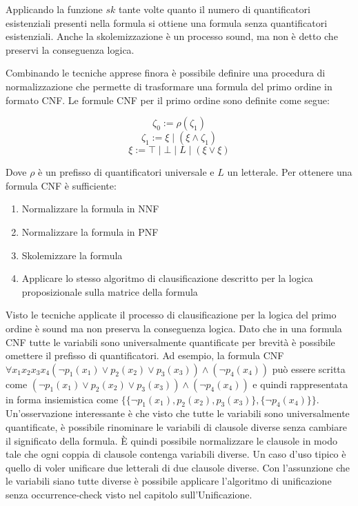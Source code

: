 \documentclass[./main.tex]{subfiles}
\begin{document}
Applicando la funzione $sk$ tante volte quanto il numero di quantificatori esistenziali presenti nella formula si ottiene una formula 
senza quantificatori esistenziali. Anche la skolemizzazione è un processo sound, ma non è detto che preservi la conseguenza logica.



Combinando le tecniche apprese finora è possibile definire una procedura di normalizzazione che permette di trasformare una formula del primo ordine
in formato CNF. Le formule CNF per il primo ordine sono definite come segue:

$$ \zeta_0 := \rho(\zeta_1) $$
$$ \zeta_1 := \xi \mid (\xi \land \zeta_1) $$
$$ \xi := \top \mid \bot \mid L \mid (\xi \lor \xi ) $$

Dove $\rho$ è un prefisso di quantificatori universale e $L$ un letterale. Per ottenere una formula CNF è sufficiente:

\begin{enumerate}
  \item Normalizzare la formula in NNF
  \item Normalizzare la formula in PNF
  \item Skolemizzare la formula
  \item Applicare lo stesso algoritmo di clausificazione descritto per la logica proposizionale sulla matrice della formula
\end{enumerate}

Visto le tecniche applicate il processo di clausificazione per la logica del primo ordine è sound ma non preserva la conseguenza logica.
Dato che in una formula CNF tutte le variabili sono universalmente quantificate per brevità è possibile omettere il prefisso di quantificatori.
Ad esempio, la formula CNF $\forall x_1 x_2 x_3 x_4 (\lnot p_1(x_1) \lor p_2(x_2) \lor p_3(x_3)) \land (\lnot p_4(x_4))$ può essere scritta come
$(\lnot p_1(x_1) \lor p_2(x_2) \lor p_3(x_3)) \land (\lnot p_4(x_4))$ e quindi rappresentata
in forma insiemistica come $\{\{\lnot p_1(x_1), p_2(x_2), p_3(x_3)\}, \{\lnot p_4(x_4)\}\}$.
Un'osservazione interessante è che visto che tutte le variabili sono universalmente quantificate, è possibile rinominare le variabili di clausole diverse senza
cambiare il significato della formula. È quindi possibile normalizzare le clausole in modo tale che ogni coppia di clausole contenga variabili diverse.
Un caso d'uso tipico è quello di voler unificare due letterali di due clausole diverse. Con l'assunzione che le variabili siano tutte diverse è possibile
applicare l'algoritmo di unificazione senza occurrence-check visto nel capitolo sull'Unificazione.
\end{document}

